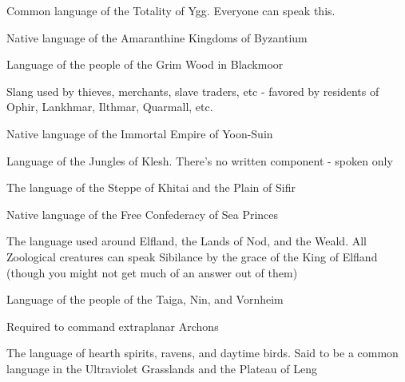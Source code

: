 {\begin{multicols}{2}


  Common language of the Totality of Ygg.  Everyone can speak this.


  Native language of the Amaranthine Kingdoms of Byzantium


  Language of the people of the Grim Wood in Blackmoor



  Slang used by thieves, merchants, slave traders, etc - favored by residents of Ophir, Lankhmar, Ilthmar, Quarmall, etc.


  Native language of the Immortal Empire of Yoon-Suin


  Language of the Jungles of Klesh. There's no written component - spoken only


  The language of the Steppe of Khitai and the Plain of Sifir


  Native language of the Free Confederacy of Sea Princes


  The language used around Elfland, the Lands of Nod, and the Weald.  All Zoological creatures can speak Sibilance by the grace of the King of Elfland (though you might not get much of an answer out of them)


  Language of the people of the Taiga, Nin, and Vornheim




Required to command extraplanar Archons


The language of hearth spirits, ravens, and daytime birds.  Said to be a common language in the Ultraviolet Grasslands and the Plateau of Leng


\end{multicols}}
